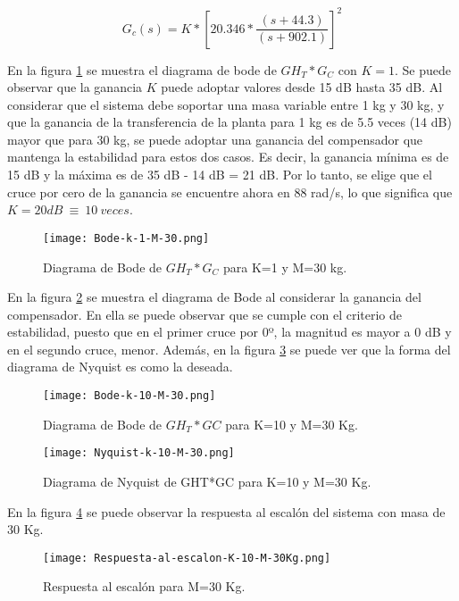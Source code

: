 \begin{equation}  
	G_c(s)=K*{[20.346*\frac{(s+44.3)}{(s+902.1)}]}^2
\end{equation} 

\noindent En la figura \ref{fig:bode-analog-compensado-para-k-1} se muestra el diagrama de bode de ${GH}_T*G_C$ con $K=1$. Se puede observar que la ganancia $K$ puede adoptar valores desde 15 dB hasta 35 dB. Al considerar que el sistema debe soportar una masa variable entre 1 kg y 30 kg, y que la ganancia de la transferencia de la planta para 1 kg es de 5.5 veces (14 dB) mayor que para 30 kg, se puede adoptar una ganancia del compensador que mantenga la estabilidad para estos dos casos. Es decir, la ganancia m\'{i}nima es de 15 dB y la m\'{a}xima es de 35 dB - 14 dB = 21 dB. Por lo tanto, se elige que el cruce por cero de la ganancia se encuentre ahora en 88 rad/s, lo que significa que $K=20dB\ \equiv \ 10\ veces$.


\begin{figure}[H]
	\centering
	\texttt{[image: Bode-k-1-M-30.png]}
	\caption{Diagrama de Bode de $GH_T*G_C$ para K=1 y M=30 kg.}
	\label{fig:bode-analog-compensado-para-k-1}
\end{figure}

\noindent En la figura \ref{fig:bode-analog-compensado-para-k-10} se muestra el diagrama de Bode al considerar la ganancia del compensador. En ella se puede observar que se  cumple con el criterio de estabilidad, puesto que en el primer cruce por 0º, la magnitud es mayor a 0 dB y en el segundo cruce, menor. Adem\'{a}s, en la figura \ref{fig:nyquist-analog-para-k-10} se puede ver que la forma del diagrama de Nyquist es como la deseada.

\begin{figure}[H]
	\centering
	\texttt{[image: Bode-k-10-M-30.png]}
	\caption{Diagrama de Bode de $GH_{T}*GC$ para K=10 y M=30 Kg.}
	\label{fig:bode-analog-compensado-para-k-10}
\end{figure}

\begin{figure}[H]
	\centering
	\texttt{[image: Nyquist-k-10-M-30.png]}
	\caption{Diagrama de Nyquist de GHT*GC para K=10 y M=30 Kg.}
	\label{fig:nyquist-analog-para-k-10}
\end{figure}

\noindent En la figura \ref{fig:rta-escalon-k-10-m-30} se puede observar la respuesta al escalón del sistema con masa de 30 Kg.

\begin{figure}[H]
	\centering
	\texttt{[image: Respuesta-al-escalon-K-10-M-30Kg.png]}
	\caption{Respuesta al escalón para M=30 Kg.}
	\label{fig:rta-escalon-k-10-m-30}
\end{figure}

